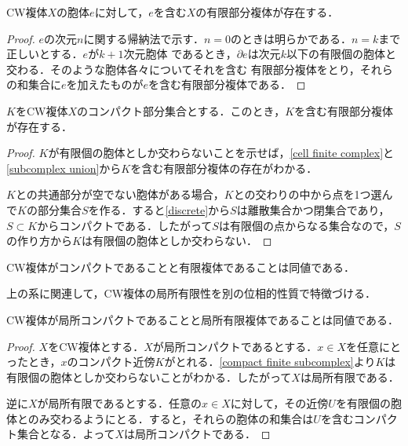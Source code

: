 \documentclass[uplatex]{jsarticle}
\begin{document}
\begin{lemma}\label{cell finite complex}
  CW複体$X$の胞体$e$に対して，$e$を含む$X$の有限部分複体が存在する．
\end{lemma}

\begin{proof}
  $e$の次元$n$に関する帰納法で示す．$n=0$のときは明らかである．$n=k$まで正しいとする．$e$が$k+1$次元胞体
  であるとき，$\partial e$は次元$k$以下の有限個の胞体と交わる．そのような胞体各々についてそれを含む
  有限部分複体をとり，それらの和集合に$e$を加えたものが$e$を含む有限部分複体である．
\end{proof}

\begin{theorem}\label{compact finite subcomplex}
  $K$をCW複体$X$のコンパクト部分集合とする．このとき，$K$を含む有限部分複体が存在する．
\end{theorem}

\begin{proof}
  $K$が有限個の胞体としか交わらないことを示せば，\cref{cell finite complex}と\cref{subcomplex union}から$K$を含む有限部分複体の存在がわかる．

  $K$との共通部分が空でない胞体がある場合，$K$との交わりの中から点を1つ選んで$K$の部分集合$S$を作る．すると\cref{discrete}から$S$は離散集合かつ閉集合であり，$S\subset K$からコンパクトである．したがって$S$は有限個の点からなる集合なので，$S$の作り方から$K$は有限個の胞体としか交わらない．
\end{proof}

\begin{corollary}
  CW複体がコンパクトであることと有限複体であることは同値である．
\end{corollary}

上の系に関連して，CW複体の局所有限性を別の位相的性質で特徴づける．

\begin{proposition}\label{locally compact locally finite}
  CW複体が局所コンパクトであることと局所有限複体であることは同値である．
\end{proposition}

\begin{proof}
  $X$をCW複体とする．$X$が局所コンパクトであるとする．$x\in X$を任意にとったとき，$x$のコンパクト近傍$K$がとれる．\cref{compact finite subcomplex}より$K$は有限個の胞体としか交わらないことがわかる．したがって$X$は局所有限である．

  逆に$X$が局所有限であるとする．任意の$x\in X$に対して，その近傍$U$を有限個の胞体とのみ交わるようにとる．すると，それらの胞体の和集合は$U$を含むコンパクト集合となる．よって$X$は局所コンパクトである．
\end{proof}
\end{document}
